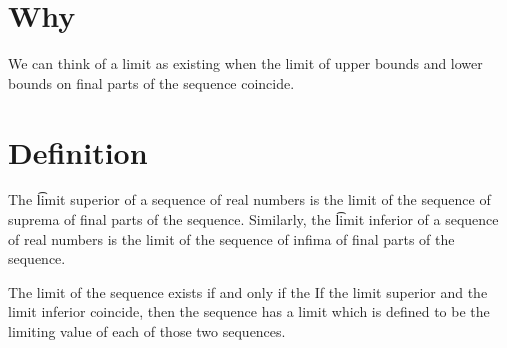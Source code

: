 
\section*{Why}

We can think of a limit as existing when the limit of upper bounds and lower bounds on final parts of the sequence coincide.

\section*{Definition}

The
\t{limit superior}
of a sequence of real numbers
is the limit of the sequence
of suprema of final parts
of the sequence.
Similarly, the
\t{limit inferior}
of a sequence of real numbers
is the limit of the sequence
of infima of final parts
of the sequence.

The limit of the sequence
exists if and only if the
If the limit superior and the
limit inferior coincide,
then the sequence has
a limit which is defined
to be the limiting value of
each of those two sequences.

\blankpage